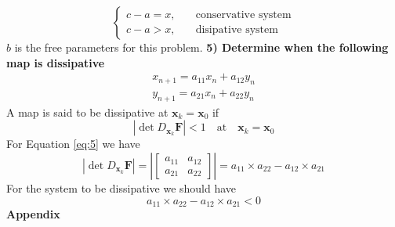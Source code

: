 \documentclass[12pt, a4paper]{extreport}
\begin{document}
%
\begin{equation}
\begin{cases}
	c - a = x, \quad &\text{conservative system} \\
	c - a > x, \quad &\text{disipative system}
\end{cases}
\end{equation}
%
$b$ is the free parameters for this problem.
\newpage
{\flushleft\large{\textbf{5) Determine when the following map is dissipative}}}
%
\begin{equation}\label{eq:5}
\begin{aligned}
	x_{n+1} = a_{11} x_n + a_{12}y_n \\
	y_{n+1} = a_{21} x_n + a_{22}y_n
\end{aligned}
\end{equation}
%
A map is said to be dissipative at $\mathbf{x}_k = \mathbf{x}_0$ if
%
\begin{equation}
	|\det D_{\mathbf{x}_k} \mathbf{F}| < 1 \quad \text{at} \quad \mathbf{x}_k = \mathbf{x}_0
\end{equation}
%
For Equation \eqref{eq:5} we have
%
\begin{equation}
|\det D_{\mathbf{x}_k} \mathbf{F}| = 
\left|
\begin{bmatrix}
a_{11} &a_{12} \\
a_{21} &a_{22}
\end{bmatrix}
\right| = 
a_{11} \times a_{22} - a_{12} \times a_{21}
\end{equation}
%
For the system to be dissipative we should have
%
\begin{equation}
	a_{11} \times a_{22} - a_{12} \times a_{21} < 0
\end{equation}
% 
\newpage
\center\large{\textbf{Appendix}}

\end{document}
